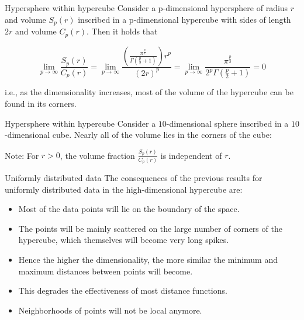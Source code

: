 \documentclass[11pt,compress,t,notes=noshow, xcolor=table]{beamer}
\begin{document}
\begin{framev}{Hypersphere within hypercube}
Consider a p-dimensional hypersphere of radius $r$ and volume $S_p(r)$ inscribed in a p-dimensional hypercube with sides of length $2r$ and volume $C_p(r)$. Then it holds that
\begin{footnotesize}
$$\lim_{p\rightarrow \infty} \frac{S_p(r)}{C_p(r)} = \lim_{p\rightarrow \infty}
\frac{( \frac{\pi^{\frac{p}{2}}}{\Gamma(\frac{p}{2}+1)} )r^p}{(2r)^p} =
 \lim_{p\rightarrow \infty} \frac{\pi^{\frac{p}{2}}}{2^p\Gamma(\frac{p}{2}+1)} = 0$$
\end{footnotesize}
i.e., as the dimensionality increases, most of the volume of the hypercube can be found in its corners.

\vfill

\end{framev}

\begin{framev}{Hypersphere within hypercube}
Consider a $10$-dimensional sphere inscribed in a $10$-dimensional cube. Nearly all of the volume lies in the corners of the cube:

\vfill


\vfill

\begin{footnotesize}
Note: For $r > 0$, the volume fraction $\frac{S_p(r)}{C_p(r)}$ is independent of $r$.
\end{footnotesize}
\end{framev}

\begin{framev}{Uniformly distributed data}
The consequences of the previous results for uniformly distributed data in the high-dimensional hypercube are:

\begin{itemize}
\item Most of the data points will lie on the boundary of the space.
\item The points will be mainly scattered on the large number of corners of the hypercube, which themselves will become very long spikes.
\item Hence the higher the dimensionality, the more similar the minimum and maximum distances between points will become.
\item This degrades the effectiveness of most distance functions.
\item Neighborhoods of points will not be local anymore.
\end{itemize}
\end{framev}
\end{document}
